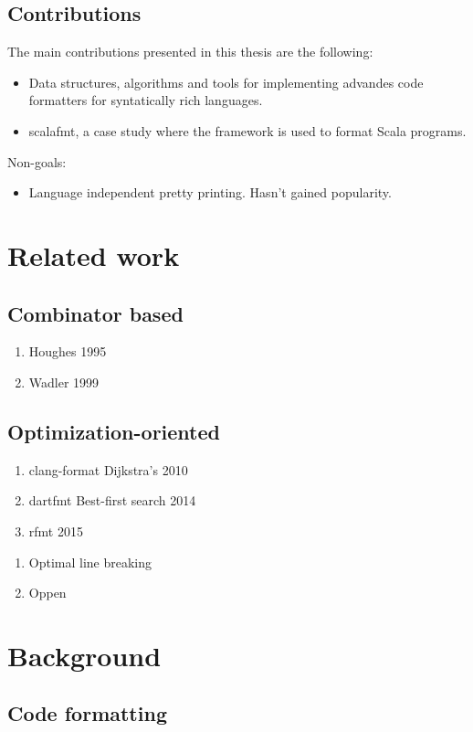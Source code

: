 \documentclass[11pt,a4paper]{article}
\begin{document}
\subsection{Contributions}
The main contributions presented in this thesis are the following:
\begin{itemize}
    \item Data structures, algorithms and tools for implementing advandes code formatters for syntatically rich languages.
    \item scalafmt, a case study where the framework is used to format Scala programs.
\end{itemize}
Non-goals:
\begin{itemize}
    \item Language independent pretty printing. Hasn't gained popularity.
\end{itemize}

\section{Related work}
\subsection{Combinator based}
\begin{enumerate}
  \item Houghes 1995
  \item Wadler 1999
\end{enumerate}
\subsection{Optimization-oriented}
\begin{enumerate}
  \item clang-format Dijkstra's 2010
  \item dartfmt Best-first search 2014
  \item rfmt 2015
\end{enumerate}
\begin{enumerate}
  \item Optimal line breaking
  \item Oppen
\end{enumerate}
\section{Background}
\subsection{Code formatting}
\end{document}
